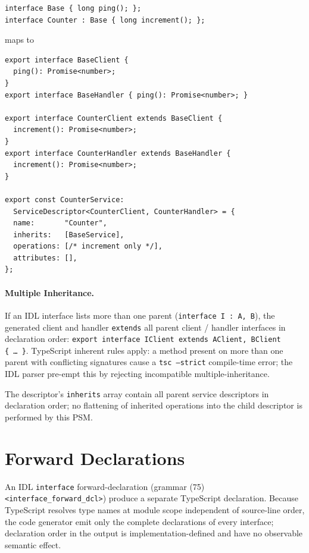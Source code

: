 \documentclass{../styles/zerodds-vendor-spec}
\begin{document}
\begin{specexample}
\begin{lstlisting}
interface Base { long ping(); };
interface Counter : Base { long increment(); };
\end{lstlisting}
maps to
\begin{lstlisting}
export interface BaseClient {
  ping(): Promise<number>;
}
export interface BaseHandler { ping(): Promise<number>; }

export interface CounterClient extends BaseClient {
  increment(): Promise<number>;
}
export interface CounterHandler extends BaseHandler {
  increment(): Promise<number>;
}

export const CounterService:
  ServiceDescriptor<CounterClient, CounterHandler> = {
  name:       "Counter",
  inherits:   [BaseService],
  operations: [/* increment only */],
  attributes: [],
};
\end{lstlisting}
\end{specexample}

\paragraph{Multiple Inheritance.} If an IDL interface lists more
than one parent (\texttt{interface I :\,A,\,B}), the generated
client and handler  \texttt{extends} all parent
client / handler interfaces in declaration order:
\texttt{export interface IClient extends AClient,\,BClient \{\,\ldots\,\}}.
TypeScript inherent rules apply: a method present on more than
one parent with conflicting signatures  cause a
\texttt{tsc --strict} compile-time error; the IDL parser
 pre-empt this by rejecting incompatible
multiple-inheritance.

The descriptor's \texttt{inherits} array  contain
all parent service descriptors in declaration order; no
flattening of inherited operations into the child descriptor is
performed by this PSM.

\section{Forward Declarations}

An IDL \texttt{interface} forward-declaration (grammar (75)
\texttt{<interface\_forward\_dcl>})  produce a
separate TypeScript declaration. Because TypeScript resolves
type names at module scope independent of source-line order, the
code generator  emit only the complete declarations
of every interface; declaration order in the output is
implementation-defined and  have no observable
semantic effect.
\end{document}
